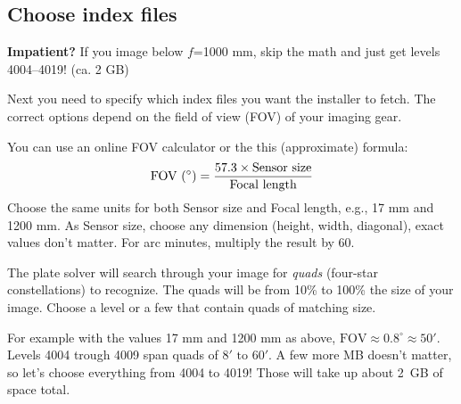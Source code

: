 \documentclass[english]{article}
\begin{document}
\subsection{Choose index files}

{\scriptsize \textbf{Impatient?} If you image below $f$=1000 mm, skip the math and just get levels 4004--4019! (ca. 2 GB)}

Next you need to specify which index files you want the installer to fetch. The correct options depend on the field of view (FOV) of your imaging gear. 

You can use an online FOV calculator or the this (approximate) formula:
\[
\text{FOV (\ensuremath{^\circ})}=\frac{57.3\times\text{Sensor size}}{\text{Focal length}}
\]
Choose the same units for both Sensor size and Focal length, e.g., 17 mm and 1200 mm. As Sensor size, choose any dimension (height, width, diagonal), exact values don't matter. For arc minutes, multiply the result by 60.

The plate solver will search through your image for \emph{quads} (four-star constellations) to recognize. The quads will be from 10\% to 100\% the size of your image. Choose a level or a few that contain quads of matching size.

For example with the values 17 mm and 1200 mm as above, $\text{FOV} \approx 0.8^\circ \approx 50'$. Levels 4004 trough 4009 span quads of $8' \text{ to } 60'$. A few more MB doesn't matter, so let's choose everything from 4004 to 4019! Those will take up about 2~GB of space total.
\end{document}
